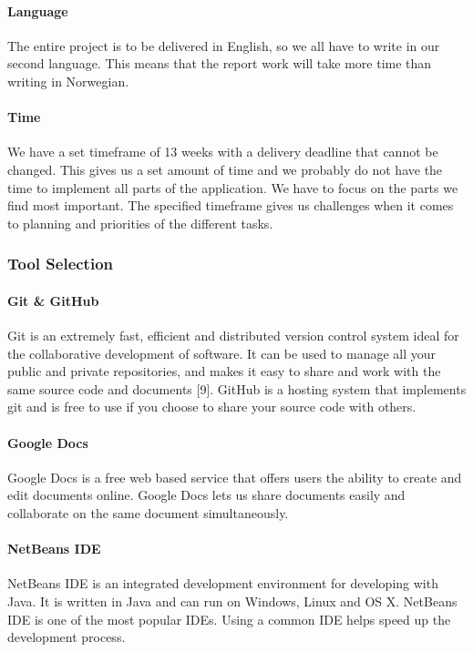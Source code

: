 \paragraph{Language}
The entire project is to be delivered in English, so we all have to write in our second language. This means that the report work will take more time than writing in Norwegian. 

\paragraph{Time}
We have a set timeframe of 13 weeks with a delivery deadline that cannot be changed. This gives us a set amount of time and we probably do not have the time to implement all parts of the application. We have to focus on the parts we find most important. The specified timeframe gives us challenges when it comes to planning and priorities of the different tasks.

\subsubsection{Tool Selection}

\paragraph{Git \& GitHub}
Git is an extremely fast, efficient and distributed version control system ideal for the collaborative development of software. It can be used to manage all your public and private repositories, and makes it easy to share and work with the same source code and documents [9]. GitHub is a hosting system that implements git and is free to use if you choose to share your source code with others. 

\paragraph{Google Docs}
Google Docs is a free web based service that offers users the ability to create and edit documents online. Google Docs lets us share documents easily and collaborate on the same document simultaneously.    

\paragraph{NetBeans IDE}
NetBeans IDE is an integrated development environment for developing with Java. It is written in Java and can run on Windows, Linux and OS X. NetBeans IDE is one of the most popular IDEs. Using a common IDE helps speed up the development process.

